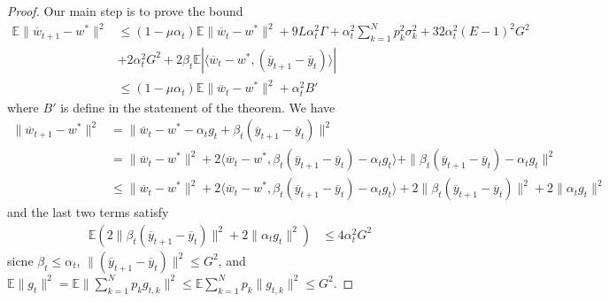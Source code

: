 \begin{proof}
	Our main step is to prove the bound 
	\begin{align*}
	\mathbb{E}\|\overline{w}_{t+1}-w^{\ast}\|^{2} & \leq(1-\mu\alpha_{t})\mathbb{E}\|\overline{w}_{t}-w^{\ast}\|^{2}+9L\alpha_{t}^{2}\Gamma+\alpha_{t}^{2}\sum_{k=1}^{N}p_{k}^{2}\sigma_{k}^{2}+32\alpha_{t}^{2}(E-1)^{2}G^{2}\\
	& +2\alpha_{t}^{2}G^{2}+2\beta_{t}\mathbb{E}|\langle\overline{w}_{t}-w^{\ast},(\overline{y}_{t+1}-\overline{y}_{t})\rangle|\\
	& \leq(1-\mu\alpha_{t})\mathbb{E}\|\overline{w}_{t}-w^{\ast}\|^{2}+\alpha_{t}^{2}B'
	\end{align*}
	where $B'$ is define in the statement of the theorem. We have 
	\begin{align*}
	\|\overline{w}_{t+1}-w^{\ast}\|^{2} & =\|\overline{w}_{t}-w^{\ast}-\alpha_{t}g_{t}+\beta_{t}(\overline{y}_{t+1}-\overline{y}_{t})\|^{2}\\
	& =\|\overline{w}_{t}-w^{\ast}\|^{2}+2\langle\overline{w}_{t}-w^{\ast},\beta_{t}(\overline{y}_{t+1}-\overline{y}_{t})-\alpha_{t}g_{t}\rangle+\|\beta_{t}(\overline{y}_{t+1}-\overline{y}_{t})-\alpha_{t}g_{t}\|^{2}\\
	& \leq\|\overline{w}_{t}-w^{\ast}\|^{2}+2\langle\overline{w}_{t}-w^{\ast},\beta_{t}(\overline{y}_{t+1}-\overline{y}_{t})-\alpha_{t}g_{t}\rangle+2\|\beta_{t}(\overline{y}_{t+1}-\overline{y}_{t})\|^{2}+2\|\alpha_{t}g_{t}\|^{2}
	\end{align*}
	and the last two terms satisfy 
	\begin{align*}
	\mathbb{E}\left(2\|\beta_{t}(\overline{y}_{t+1}-\overline{y}_{t})\|^{2}+2\|\alpha_{t}g_{t}\|^{2}\right) & \leq4\alpha_{t}^{2}G^{2}
	\end{align*}
	sicne $\beta_{t}\leq\alpha_{t}$, $\|(\overline{y}_{t+1}-\overline{y}_{t})\|^{2}\leq G^{2}$,
	and $\mathbb{E}\|g_{t}\|^{2}=\mathbb{E}\|\sum_{k=1}^{N}p_{k}g_{t,k}\|^{2}\leq\mathbb{E}\sum_{k=1}^{N}p_{k}\|g_{t,k}\|^{2}\leq G^{2}$. 
	

\end{proof}
